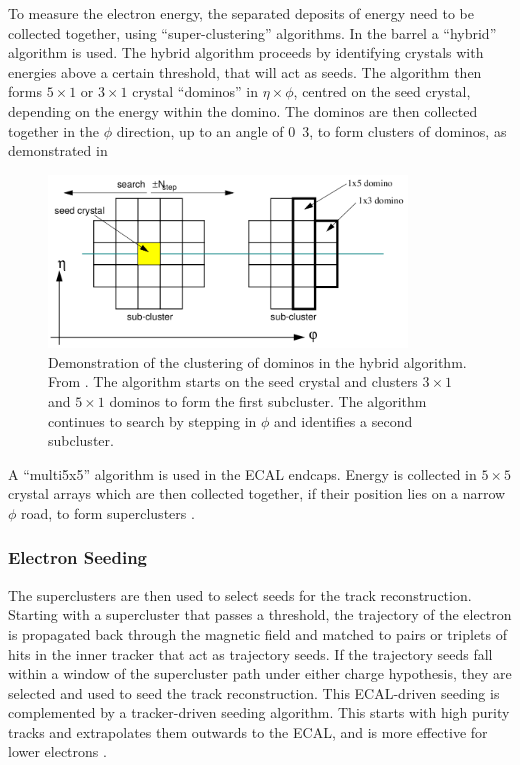 To measure the electron energy, the separated deposits of energy need to be
collected together, using ``super-clustering'' algorithms. 
In the barrel a ``hybrid'' algorithm is used. The hybrid algorithm proceeds by
identifying crystals with energies above a certain threshold, that will act as
seeds. The algorithm then forms $5\times1$ or $3\times1$ crystal ``dominos'' in
$\eta\times\phi$, centred on the seed crystal, depending on the
energy within the domino. The dominos are then collected together in the $\phi$
direction, up to an angle of \unit{0.3}{\rad}, to form clusters of dominos,
as demonstrated in  \cite{meschi2001electron}

\begin{figure}[htbp]
  \centering
  \includegraphics[width=0.85\textwidth]{hybridalgo}
  \caption[Demonstration of the clustering of dominos in the hybrid algorithm.]
{Demonstration of the clustering of dominos in the hybrid algorithm.  From
\cite{meschi2001electron}. The algorithm starts on the seed crystal and clusters
$3\times1$ and $5\times1$ dominos to form the first subcluster. The algorithm
continues to search by stepping in $\phi$ and identifies a second subcluster.}
  \label{fig:hybrid}
\end{figure}

A ``multi5x5'' algorithm is used in the ECAL endcaps. Energy is collected in
$5\times5$ crystal arrays which are then collected together, if their position lies on
a narrow $\phi$ road, to form superclusters \cite{meschi2001electron}.

\subsubsection{Electron Seeding}
The superclusters are then used to select seeds for the track reconstruction.
Starting with a supercluster that passes a \pt threshold,
the trajectory of the electron is propagated back through the magnetic field and
matched to pairs or triplets of hits in the inner tracker that act as trajectory
seeds.  If the trajectory seeds fall within a window of the supercluster path
under either charge hypothesis, they are selected and used to seed the track
reconstruction.  This ECAL-driven seeding is complemented by a tracker-driven
seeding algorithm.  This starts with high purity tracks and extrapolates them
outwards to the ECAL, and is more effective for lower \pt electrons
\cite{baffioni2007electron,adam2009electron}.

